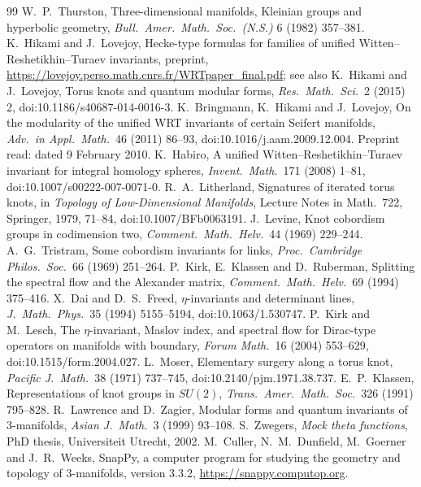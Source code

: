 \documentclass[11pt]{article}
\theoremstyle{definition}
\begin{document}
\begin{thebibliography}{99}
 W.~P.~Thurston, Three-dimensional manifolds, Kleinian groups and hyperbolic geometry, \emph{Bull.\ Amer.\ Math.\ Soc.\ (N.S.)} 6 (1982) 357--381.
 K.~Hikami and J.~Lovejoy, Hecke-type formulas for families of unified Witten--Reshetikhin--Turaev invariants, preprint, \url{https://lovejoy.perso.math.cnrs.fr/WRTpaper_final.pdf}; see also K.~Hikami and J.~Lovejoy, Torus knots and quantum modular forms, \emph{Res.\ Math.\ Sci.}\ 2 (2015) 2, doi:10.1186/s40687-014-0016-3.
 K.~Bringmann, K.~Hikami and J.~Lovejoy, On the modularity of the unified WRT invariants of certain Seifert manifolds, \emph{Adv.\ in Appl.\ Math.}\ 46 (2011) 86--93, doi:10.1016/j.aam.2009.12.004. Preprint read: dated 9 February 2010.
 K.~Habiro, A unified Witten--Reshetikhin--Turaev invariant for integral homology spheres, \emph{Invent.\ Math.}\ 171 (2008) 1--81, doi:10.1007/s00222-007-0071-0.
 R.~A.~Litherland, Signatures of iterated torus knots, in \emph{Topology of Low-Dimensional Manifolds}, Lecture Notes in Math.\ 722, Springer, 1979, 71--84, doi:10.1007/BFb0063191.
 J.~Levine, Knot cobordism groups in codimension two, \emph{Comment.\ Math.\ Helv.}\ 44 (1969) 229--244.
 A.~G.~Tristram, Some cobordism invariants for links, \emph{Proc.\ Cambridge Philos.\ Soc.}\ 66 (1969) 251--264.
 P.~Kirk, E.~Klassen and D.~Ruberman, Splitting the spectral flow and the Alexander matrix, \emph{Comment.\ Math.\ Helv.}\ 69 (1994) 375--416.
 X.~Dai and D.~S.~Freed, $\eta$-invariants and determinant lines, \emph{J.\ Math.\ Phys.}\ 35 (1994) 5155--5194, doi:10.1063/1.530747.
 P.~Kirk and M.~Lesch, The $\eta$-invariant, Maslov index, and spectral flow for Dirac-type operators on manifolds with boundary, \emph{Forum Math.}\ 16 (2004) 553--629, doi:10.1515/form.2004.027.
 L.~Moser, Elementary surgery along a torus knot, \emph{Pacific J.\ Math.}\ 38 (1971) 737--745, doi:10.2140/pjm.1971.38.737.
 E.~P.~Klassen, Representations of knot groups in $SU(2)$, \emph{Trans.\ Amer.\ Math.\ Soc.}\ 326 (1991) 795--828.
 R.~Lawrence and D.~Zagier, Modular forms and quantum invariants of 3-manifolds, \emph{Asian J.\ Math.}\ 3 (1999) 93--108.
 S.~Zwegers, \emph{Mock theta functions}, PhD thesis, Universiteit Utrecht, 2002.
 M.~Culler, N.~M.~Dunfield, M.~Goerner and J.~R.~Weeks, SnapPy, a computer program for studying the geometry and topology of 3-manifolds, version 3.3.2, \url{https://snappy.computop.org}.

\end{thebibliography}
\end{document}
